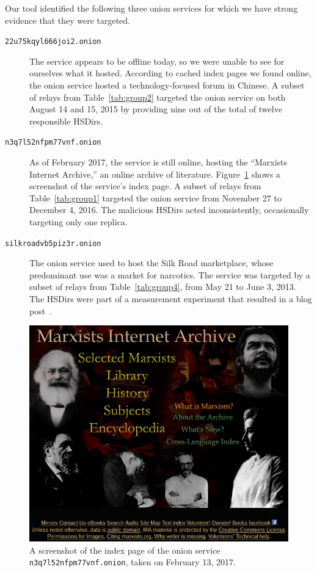 Our tool identified the following three onion services for which we have strong
evidence that they were targeted.

\begin{description}
	\item[\texttt{22u75kqyl666joi2.onion}] The service appears to be offline
		today, so we were unable to see for ourselves what it hosted.  According
		to cached index pages we found online, the onion service hosted a
		technology-focused forum in Chinese.  A subset of relays from
		Table~\ref{tab:group2} targeted the onion service on both August 14 and
		15, 2015 by providing nine out of the total of twelve responsible
		HSDirs.

	\item[\texttt{n3q7l52nfpm77vnf.onion}] As of February 2017, the service is
		still online, hosting the ``Marxists Internet Archive,'' an online
		archive of literature.  Figure~\ref{fig:archive} shows a screenshot of
		the service's index page.  A subset of relays from
		Table~\ref{tab:group1} targeted the onion service from November 27 to
		December 4, 2016.  The malicious HSDirs acted inconsistently,
		occasionally targeting only one replica.

	\item[\texttt{silkroadvb5piz3r.onion}] The onion service used to host the
		Silk Road marketplace, whose predominant use was a market for narcotics.
		The service was targeted by a subset of relays from
		Table~\ref{tab:group4}, from May 21 to June 3, 2013.  The HSDirs were
		part of a measurement experiment that resulted in a blog
		post~\cite{OCearbhaill2013a}.
\end{description}

\begin{figure}[t]
	\centering
	\includegraphics[width=\linewidth]{figures/marxists-internet-archive.jpg}
	\caption{A screenshot of the index page of the onion service
		\texttt{n3q7l52nfpm77vnf.onion}, taken on February 13, 2017.}
	\label{fig:archive}
\end{figure}
